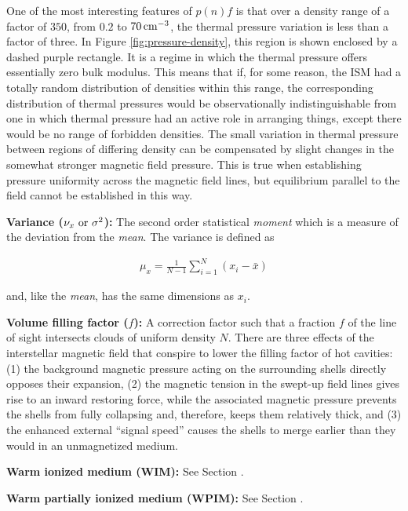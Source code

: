 \documentclass[a4paper,10pt]{article}
\begin{document}
{\noindent}One of the most interesting features of $p(n)f$ is that over a density range of a factor of $350$, from $0.2$ to $70\,{\rm cm^{-3}}$, the thermal pressure variation is less than a factor of three. In Figure \ref{fig:pressure-density}, this region is shown enclosed by a dashed purple rectangle. It is a regime in which the thermal pressure offers essentially zero bulk modulus. This means that if, for some reason, the ISM had a totally random distribution of densities within this range, the corresponding distribution of thermal pressures would be observationally indistinguishable from one in which thermal pressure had an active role in arranging things, except there would be no range of forbidden densities. The small variation in thermal pressure between regions of differing density can be compensated by slight changes in the somewhat stronger magnetic field pressure. This is true when establishing pressure uniformity across the magnetic field lines, but equilibrium parallel to the field cannot be established in this way.

{\noindent}\textbf{Variance ($\nu_x~{\rm or}~\sigma^2$):} The second order statistical \textit{moment} which is a measure of the deviation from the \textit{mean}. The variance is defined as

\begin{align*}
    \mu_x = \frac{1}{N-1} \sum_{i=1}^N (x_i-\bar{x})
\end{align*}

{\noindent}and, like the \textit{mean}, has the same dimensions as $x_i$.

{\noindent}\textbf{Volume filling factor ($f$):} A correction factor such that a fraction $f$ of the line of sight intersects clouds of uniform density $N$. There are three effects of the interstellar magnetic field that conspire to lower the filling factor of hot cavities: (1) the background magnetic pressure acting on the surrounding shells directly opposes their expansion, (2) the magnetic tension in the swept-up field lines gives rise to an inward restoring force, while the associated magnetic pressure prevents the shells from fully collapsing and, therefore, keeps them relatively thick, and (3) the enhanced external ``signal speed'' causes the shells to merge earlier than they would in an unmagnetized medium.

{\noindent}\textbf{Warm ionized medium (WIM):} See Section \label{sec:ism}. 

{\noindent}\textbf{Warm partially ionized medium (WPIM):} See Section \label{sec:ism}. 
\end{document}
